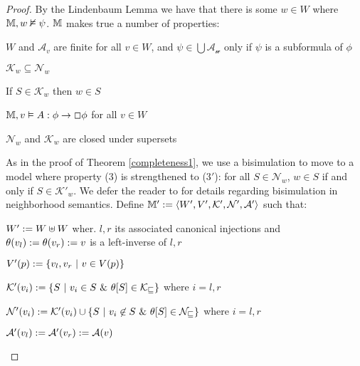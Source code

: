 \begin{proof}
  
  
  By the Lindenbaum Lemma we have that there is some $w \in W$ where
  $\mathbbm{M}, w \nvDash \psi$.  $\mathbbm{M}$ makes true a number of
  properties:
  \begin{enumeratenumeric}
    \item $W$ and $\mathcal{A}_v$ are finite for all $v \in W$, and $\psi \in
    \bigcup \mathcal{A_w}$ only if $\psi$ is a subformula of $\phi$
    
    \item $\mathcal{K}_w \subseteq \mathcal{N}_w$
    
    \item If $S \in \mathcal{K}_w$ then $w \in S$
    
    \item $\mathbbm{M}, v \vDash A : \phi \rightarrow \Box \phi$ for all $v
    \in W$
    
    \item $\mathcal{N}_w$ and $\mathcal{K}_w$ are closed under supersets
  \end{enumeratenumeric}
  
  
  As in the proof of Theorem \ref{completeness1}, we use a bisimulation to
  move to a model where property (3) is strengthened to (3$'$): for all $S \in
  \mathcal{N}_w$, $w \in S$ if and only if $S \in \mathcal{K}'_w$.  We defer
  the reader to {\cite{hansen_bisimulation_2007,pauly_bisimulation_1999}} for
  details regarding bisimulation in neighborhood semantics.  Define
  $\mathbbm{M}' \assign \langle W', V', \mathcal{K}', \mathcal{N}',
  \mathcal{A}' \rangle$ such that:
  \begin{itemizedot}
    \item $W' \assign W \uplus W$ wher.  $l, r$ its associated canonical
    injections and $\theta (v_l) \assign \theta (v_r) \assign v$ is a
    left-inverse of $l, r$
    
    \item $V' (p) \assign \{v_l, v_r \  | \  v \in V
    (p)\}$
    
    \item $\mathcal{K}' (v_i) \assign \{S \  | \  v_i \in
    S \  \& \  \theta [S] \in \mathcal{K_v} \}$ where $i =
    l, r$
    
    \item $\mathcal{N}' (v_i) \assign \mathcal{K}' (v_i) \cup \{S \ 
    | \  v_i \nin S \  \& \  \theta [S] \in
    \mathcal{N_v} \}$ where $i = l, r$
    
    \item $\mathcal{A}' (v_l) \assign \mathcal{A}' (v_r) \assign \mathcal{A}
    (v)$
  \end{itemizedot}
  

\end{proof}

